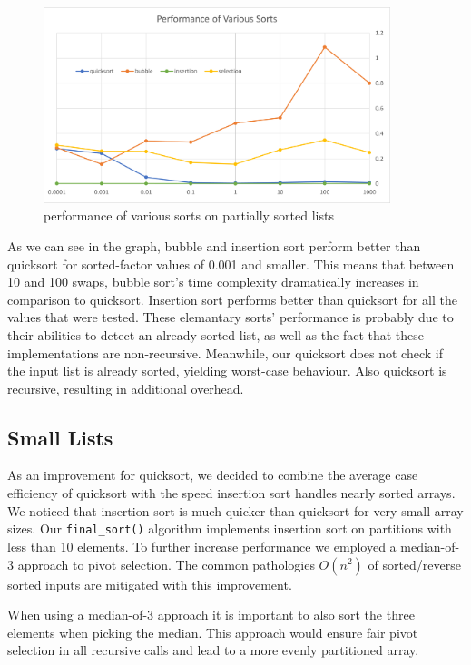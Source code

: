 \documentclass[12pt]{article}
\begin{document}
\begin{figure}[H]
\centering
\includegraphics[width=0.9\textwidth,height=\textheight,keepaspectratio]{sorted_factor}
\caption{performance of various sorts on partially sorted lists}
\label{Figure: w2}
\end{figure}

\noindent As we can see in the graph, bubble and insertion sort perform better than quicksort for sorted-factor values of 0.001 and smaller. This means that between 10 and 100 swaps, bubble sort's time complexity dramatically increases in comparison to quicksort. Insertion sort performs better than quicksort for all the values that were tested. These elemantary sorts' performance is probably due to their abilities to detect an already sorted list, as well as the fact that these implementations are non-recursive. Meanwhile, our quicksort does not check if the input list is already sorted, yielding worst-case behaviour. Also quicksort is recursive, resulting in additional overhead.

\subsection{Small Lists}

As an improvement for quicksort, we decided to combine the average case efficiency of quicksort with the speed insertion sort handles nearly sorted arrays. We noticed that insertion sort is much quicker than quicksort for very small array sizes. Our \verb+final_sort()+ algorithm implements insertion sort on partitions with less than 10 elements. To further increase performance we employed a median-of-3 approach to pivot selection. The common pathologies $O(n^2)$ of sorted/reverse sorted inputs are mitigated with this improvement. 

When using a median-of-3 approach it is important to also sort the three elements when picking the median. This approach would ensure fair pivot selection in all recursive calls and lead to a more evenly partitioned array.
\end{document}
